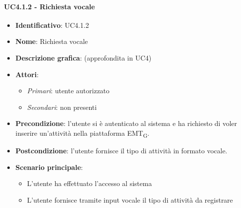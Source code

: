 \paragraph{UC4.1.2 - Richiesta vocale}
\begin{itemize}
   \item \textbf{Identificativo}: UC4.1.2
   \item \textbf{Nome}: Richiesta vocale
   \item \textbf{Descrizione grafica}: (approfondita in UC4)
   \item \textbf{Attori}:
   \begin{itemize} 
       \item \textit{Primari}: utente autorizzato
       \item \textit{Secondari}: non presenti
   \end{itemize}
       \item \textbf{Precondizione}: l'utente si è autenticato al sistema e ha richiesto di voler inserire un'attività nella piattaforma EMT\textsubscript{G}. 
       \item \textbf{Postcondizione}: l'utente fornisce il tipo di attività in formato vocale. 
    \item \textbf{Scenario principale}: 
       \begin{itemize}
           \item L'utente ha effettuato l'accesso al sistema 
           \item L'utente fornisce tramite input vocale il tipo di attività da  registrare
       \end{itemize}
\end{itemize}


